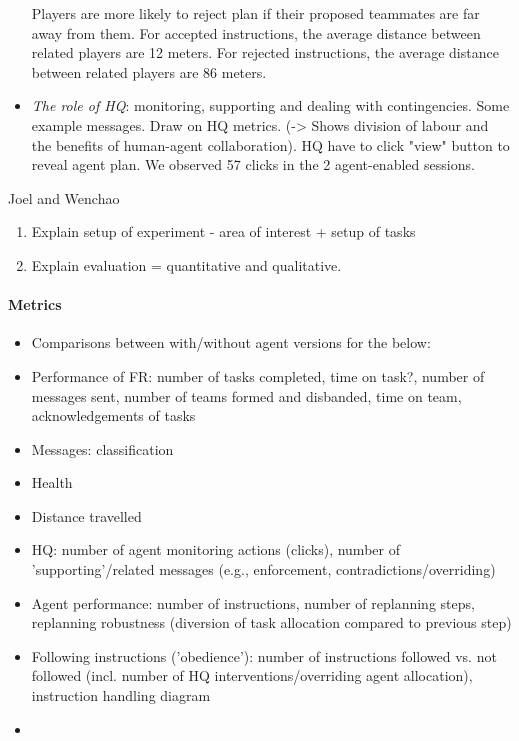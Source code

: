 \begin{itemize}
Players are more likely to reject plan if their proposed teammates are far away from them.
For accepted instructions, the average distance between related players are 12 meters.
For rejected instructions, the average distance between related players are 86 meters.

\item \textit{The role of HQ}: monitoring, supporting and dealing with contingencies. Some example messages. Draw on HQ metrics. (-> Shows division of labour and the benefits of human-agent collaboration).
HQ have to click "view" button to reveal agent plan. We observed 57 clicks in the 2 agent-enabled sessions. 

\end{itemize} 
 
Joel and Wenchao
\begin{enumerate}
\item Explain setup of experiment - area of interest + setup of tasks
\item Explain evaluation = quantitative and qualitative.
\end{enumerate}
\paragraph{Metrics}
\begin{itemize}
\item{Comparisons between with/without agent versions for the below:}
\item{Performance of FR: number of tasks completed, time on task?, number of messages sent, number of teams formed and disbanded, time on team, acknowledgements of tasks}
\item{Messages: classification}
\item{Health}
\item{Distance travelled}
\item{HQ: number of agent monitoring actions (clicks), number of 'supporting'/related messages (e.g., enforcement, contradictions/overriding)}
\item{Agent performance: number of instructions, number of replanning steps, replanning robustness (diversion of task allocation compared to previous step)}
\item{Following instructions ('obedience'): number of instructions followed vs. not followed (incl. number of HQ interventions/overriding agent allocation), instruction handling diagram}
\item
\end{itemize}
